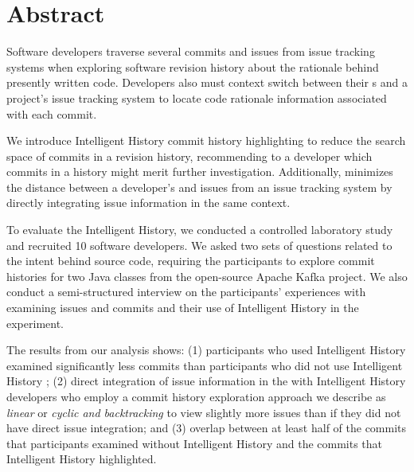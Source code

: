
\chapter{Abstract}


Software developers traverse several commits and issues from issue tracking systems 
when exploring software revision history  about the rationale behind presently written code.
Developers also must context switch between their s and a project's 
issue tracking system to locate code rationale information associated with each commit.

We introduce Intelligent History commit history highlighting to reduce the search space of 
commits in a revision history, recommending to a developer which commits in a history might merit further investigation.
Additionally,  minimizes the distance between a developer's  and issues from an issue tracking system
by directly integrating issue information in the same context.

To evaluate the Intelligent History, we conducted a controlled laboratory study and recruited 10 software developers.
We asked two sets of questions related to the intent behind source code, requiring the participants to explore 
commit histories for two Java classes from the open-source Apache Kafka project.
We also conduct a semi-structured interview on the participants' experiences with examining issues and commits 
and their use of Intelligent History in the experiment.

The results from our analysis shows:
(1) participants who used Intelligent History examined significantly
less commits than participants who did not use Intelligent History
;
(2) direct integration of issue information in the 
with Intelligent History  developers who employ a commit history exploration approach
we describe as \textit{linear} or \textit{cyclic and backtracking} to view slightly more issues than if they did not have
direct issue integration; and
(3)  overlap between at least half of the commits
that participants examined without Intelligent History and the commits that Intelligent History
highlighted.

